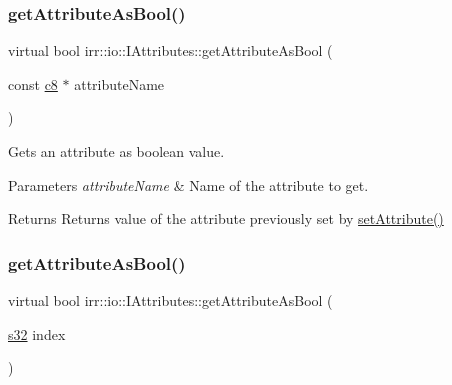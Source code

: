 \subsubsection{\texorpdfstring{get\+Attribute\+As\+Bool()}{getAttributeAsBool()}\hspace{0.1cm}{\footnotesize\ttfamily [2/4]}}
{\footnotesize\ttfamily virtual bool irr\+::io\+::\+I\+Attributes\+::get\+Attribute\+As\+Bool (\begin{DoxyParamCaption}\item[{const \hyperlink{namespaceirr_a9395eaea339bcb546b319e9c96bf7410}{c8} $\ast$}]{attribute\+Name }\end{DoxyParamCaption})\hspace{0.3cm}{\ttfamily [pure virtual]}}



Gets an attribute as boolean value. 


\begin{DoxyParams}{Parameters}
{\em attribute\+Name} & Name of the attribute to get. \\
\hline
\end{DoxyParams}
\begin{DoxyReturn}{Returns}
Returns value of the attribute previously set by \hyperlink{classirr_1_1io_1_1IAttributes_a03fa31acb481ae23678676cc183f09a6}{set\+Attribute()} 
\end{DoxyReturn}
\mbox{\label{classirr_1_1io_1_1IAttributes_acf9dc477c8610923c373d2ad15ff7752}} 
\subsubsection{\texorpdfstring{get\+Attribute\+As\+Bool()}{getAttributeAsBool()}\hspace{0.1cm}{\footnotesize\ttfamily [3/4]}}
{\footnotesize\ttfamily virtual bool irr\+::io\+::\+I\+Attributes\+::get\+Attribute\+As\+Bool (\begin{DoxyParamCaption}\item[{\hyperlink{namespaceirr_ac66849b7a6ed16e30ebede579f9b47c6}{s32}}]{index }\end{DoxyParamCaption})\hspace{0.3cm}{\ttfamily [pure virtual]}}



